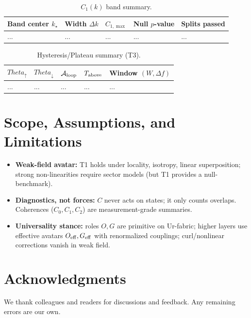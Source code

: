 \documentclass[12pt,a4paper,oneside]{scrreprt}
\def\Theta{Theta}%
\begin{document}
\begin{table}[htbp]\centering
\caption{$C_1(k)$ band summary.}
\begin{tabular}{lllll}\toprule
Band center $k_\star$ & Width $\Delta k$ & $C_{1,\max}$ & Null $p$-value & Splits passed \\\midrule
... & ... & ... & ... & ...\\ \bottomrule
\end{tabular}
\end{table}

\begin{table}[htbp]\centering
\caption{Hysteresis/Plateau summary (T3).}
\begin{tabular}{lllll}\toprule
$\Theta_\uparrow$ & $\Theta_\downarrow$ & $\mathcal A_{\rm loop}$ & $T_{\rm above}$ & Window $(W,\Delta f)$ \\\midrule
... & ... & ... & ... & ...\\ \bottomrule
\end{tabular}
\end{table}

\chapter{Scope, Assumptions, and Limitations}\label{app:limits}
\begin{itemize}
\item \textbf{Weak-field avatar:} T1 holds under locality, isotropy, linear superposition; strong non-linearities require sector models (but T1 provides a null-benchmark).
\item \textbf{Diagnostics, not forces:} $C$ never acts on states; it only counts overlaps. Coherences ($C_0,C_1,C_2$) are measurement-grade summaries.
\item \textbf{Universality stance:} roles $O,G$ are primitive on Ur-fabric; higher layers use effective avatars $O_{\rm eff},G_{\rm eff}$ with renormalized couplings; curl/nonlinear corrections vanish in weak field.
\end{itemize}


\chapter*{Acknowledgments}
We thank colleagues and readers for discussions and feedback. Any remaining errors are our own.
\end{document}
